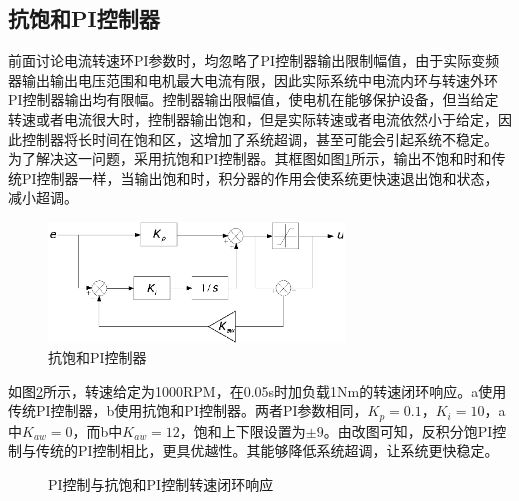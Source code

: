 \subsection{抗饱和PI控制器}
前面讨论电流转速环PI参数时，均忽略了PI控制器输出限制幅值，由于实际变频器输出输出电压范围和电机最大电流有限，因此实际系统中电流内环与转速外环PI控制器输出均有限幅。控制器输出限幅值，使电机在能够保护设备，但当给定转速或者电流很大时，控制器输出饱和，但是实际转速或者电流依然小于给定，因此控制器将长时间在饱和区，这增加了系统超调，甚至可能会引起系统不稳定。
为了解决这一问题，采用抗饱和PI控制器。其框图如图\ref{fig:antiwindup_pi}所示，输出不饱和时和传统PI控制器一样，当输出饱和时，积分器的作用会使系统更快速退出饱和状态，减小超调\cite{antiwindup,antiwindup1}。
\begin{figure}[H]
	\centering
	\includegraphics[width=0.7\textwidth]{figs/antiwindup_pi.eps}
	\caption{抗饱和PI控制器}
	\label{fig:antiwindup_pi}
\end{figure}
如图\ref{fig:pi_speed_loop}所示，转速给定为1000RPM，在0.05s时加负载1Nm的转速闭环响应。a使用传统PI控制器，b使用抗饱和PI控制器。两者PI参数相同，$K_{p}=0.1$，$K_{i}=10$，a中$K_{aw}=0$，而b中$K_{aw}=12$，饱和上下限设置为$\pm 9$。由改图可知，反积分饱PI控制与传统的PI控制相比，更具优越性。其能够降低系统超调，让系统更快稳定。
\begin{figure} [h]
	\centering%
	\hspace{2em}%
	\caption{PI控制与抗饱和PI控制转速闭环响应}
	\label{fig:pi_speed_loop}
\end{figure}
